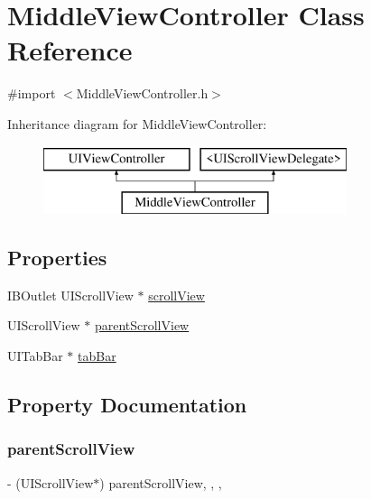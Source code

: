 \hypertarget{interface_middle_view_controller}{}\section{Middle\+View\+Controller Class Reference}
\label{interface_middle_view_controller}


{\ttfamily \#import $<$Middle\+View\+Controller.\+h$>$}

Inheritance diagram for Middle\+View\+Controller\+:\begin{figure}[H]
\begin{center}
\leavevmode
\includegraphics[height=2.000000cm]{interface_middle_view_controller}
\end{center}
\end{figure}
\subsection*{Properties}
\begin{DoxyCompactItemize}
\item 
I\+B\+Outlet U\+I\+Scroll\+View $\ast$ \hyperlink{interface_middle_view_controller_a07e05a1a5dafe5122a08fafcf08e2909}{scroll\+View}
\item 
U\+I\+Scroll\+View $\ast$ \hyperlink{interface_middle_view_controller_a2411c484bbccd2df862cbb157b47cc27}{parent\+Scroll\+View}
\item 
U\+I\+Tab\+Bar $\ast$ \hyperlink{interface_middle_view_controller_a981847da359073c34502cb0fa34a08cc}{tab\+Bar}
\end{DoxyCompactItemize}


\subsection{Property Documentation}
\hypertarget{interface_middle_view_controller_a2411c484bbccd2df862cbb157b47cc27}{}\label{interface_middle_view_controller_a2411c484bbccd2df862cbb157b47cc27} 
\subsubsection{\texorpdfstring{parent\+Scroll\+View}{parentScrollView}}
{\footnotesize\ttfamily -\/ (U\+I\+Scroll\+View$\ast$) parent\+Scroll\+View\hspace{0.3cm}{\ttfamily [read]}, {\ttfamily [write]}, {\ttfamily [nonatomic]}, {\ttfamily [weak]}}


